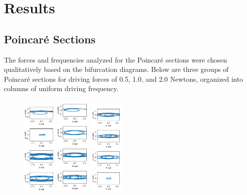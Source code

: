 \documentclass[11pt]{article} %
\begin{document}
\section{Results}
    \subsection{Poincar\'e Sections}
    The forces and frequencies analyzed for the Poincar\'e sections were chosen qualitatively based on the bifurcation diagrams. Below are
    three groups of Poincar\'e sections for driving forces of 0.5, 1.0, and 2.0 Newtons, organized into columns of uniform driving frequency. 
    \begin{figure}[H]
        \centering
        \includegraphics[width=0.15\textwidth]{pcr_0.5_0.15.png}
        \includegraphics[width=0.15\textwidth]{pcr_0.5_0.3.png}
        \includegraphics[width=0.15\textwidth]{pcr_0.5_0.5.png}

\end{figure}
\end{document}
